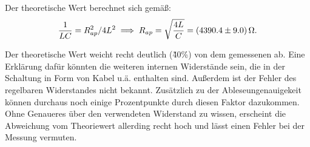 Der theoretische Wert berechnet sich gemäß:
\begin{equation}
  \frac{1}{LC} = R_{ap}^2/4L^2 \\
  \implies R_{ap} = \sqrt{\frac{4L}{C}} = \SI{4390.4 \pm 9.0}{\ohm}.
\end{equation}

Der theoretische Wert weicht recht deutlich (\~40\%) von dem gemessenen ab.
Eine Erklärung dafür könnten die weiteren internen Widerstände sein, die in
der Schaltung in Form von Kabel u.ä. enthalten sind. Außerdem ist der Fehler
des regelbaren Widerstandes nicht bekannt. Zusätzlich zu der Ableseungenauigekeit
können durchaus noch einige Prozentpunkte durch diesen Faktor dazukommen.
Ohne Genaueres über den verwendeten Widerstand zu wissen, erscheint die
Abweichung vom Theoriewert allerding recht hoch und lässt einen Fehler
bei der Messung vermuten.

